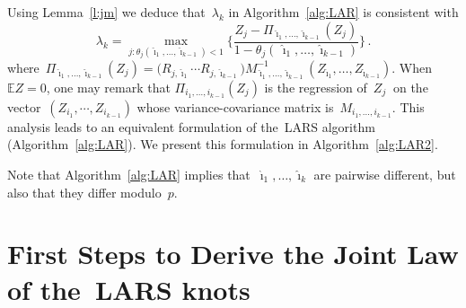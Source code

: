 \documentclass[final,numbib]{imaiai}%
\numberwithin{equation}{section}
\def\eq{\begin{equation}}
\def\qe{\end{equation}}
\def\bbE{\mathds{E}}
\renewcommand{\hat}{\widehat}
\newcommand{\<}{\langle}
\renewcommand{\>}{\rangle}
\newcommand{\1}{\mathds{1}}
\begin{document}
{\noindent 
Using Lemma~\ref{l:jm} we deduce that~$\lambda_k$ in Algorithm~\ref{alg:LAR} is consistent with
 \eq
 \label{e:lambda_max}
 \lambda_k=  \max_{j : \theta_j( \hat \imath_1, \ldots,\hat \imath_{k-1}) <1} 
\bigg\{ \frac{Z_j - \Pi_{\hat \imath_1,\ldots,\hat \imath_{k-1}}  (Z_j)}{ 1-\theta_j(\,\hat \imath_1,\ldots,\hat \imath_{k-1})}\bigg\}\,.
 \qe
 where~$
\Pi_{\hat\imath_1,\ldots,\hat \imath_{k-1}} (Z_j) =  \big(R_{j,\hat\imath_1} \cdots R_{j,\hat\imath_{k-1}}  \big)M^{-1}_{\hat\imath_1,\ldots,\hat\imath_{k-1}}  
(Z_{\hat\imath_1}, \ldots, Z_{\hat\imath_{k-1}})$. When~$\bbE Z=0$, one may remark that $\Pi_{ i_1,\ldots, i_{k-1}} (Z_j)$ is the regression of~$Z_j~$ on the vector~$ (Z_{i_1}, \cdots , Z_{i_{k-1}})$ whose variance-covariance matrix is~$M_{i_1,\ldots, i_{k-1}}$. This analysis leads to an equivalent formulation of the~LARS algorithm (Algorithm~\ref{alg:LAR}). We present this formulation in Algorithm~\ref{alg:LAR2}.

 \begin{remark} \label{ZAZA2}
  Note  that Algorithm~\ref{alg:LAR} implies that~$\hat \imath_1,\ldots,\hat \imath_k$ are pairwise different, but also  that they differ modulo~$p$. %
  \end{remark}
 
  
    
   



 
\section{First Steps to Derive the Joint Law of the~LARS knots}
\label{app:FirstSteps}


}
\end{document}
